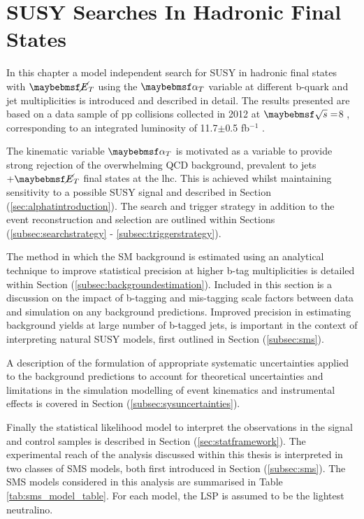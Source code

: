 \chapter{SUSY Searches In Hadronic Final States}
\label{chap:SUSYsearches}

In this chapter a model independent search for \ac{SUSY} in hadronic final states with $\met$ using the $\alphat$ variable at different b-quark and jet multiplicities is introduced and described in detail. The results presented are based on a data sample of pp collisions collected in 2012 at $\com =$8 \TeV, corresponding to an integrated luminosity of 11.7$\pm$0.5 fb$^{-1}$ \cite{ra1_epjc}.

The kinematic variable $\alphat$ is motivated as a variable to provide strong rejection of the overwhelming QCD background, prevalent to jets $+ \met$ final states at the \ac{lhc}. This is achieved whilst maintaining sensitivity to a possible \ac{SUSY} signal and described in Section (\ref{sec:alphatintroduction}). The search and trigger strategy in addition to the event reconstruction and selection are outlined within Sections (\ref{subsec:searchstrategy} - \ref{subsec:triggerstrategy}). 

The method in which the \ac{SM} background is estimated using an analytical technique to improve statistical precision at higher b-tag multiplicities is detailed within Section (\ref{subsec:backgroundestimation}). Included in this section is a discussion on the impact of b-tagging and mis-tagging scale factors between data and simulation on any background predictions. Improved precision in estimating background yields at large number of b-tagged jets, is important in the context of interpreting natural \ac{SUSY} models, first outlined in Section (\ref{subsec:sms}).

A description of the formulation of appropriate systematic uncertainties applied to the background predictions to account for theoretical uncertainties and limitations in the simulation modelling of event kinematics and instrumental effects is covered in Section (\ref{subsec:sysuncertainties}).

Finally the statistical likelihood model to interpret the observations in the signal and control samples is described in Section (\ref{sec:statframework}). The experimental reach of the analysis discussed within this thesis is interpreted in two classes of \ac{SMS} models, both first introduced in Section (\ref{subsec:sms}). The \ac{SMS} models considered in this analysis are summarised in Table \ref{tab:sms_model_table}. For each model, the \ac{LSP} is assumed to be the lightest neutralino. 

